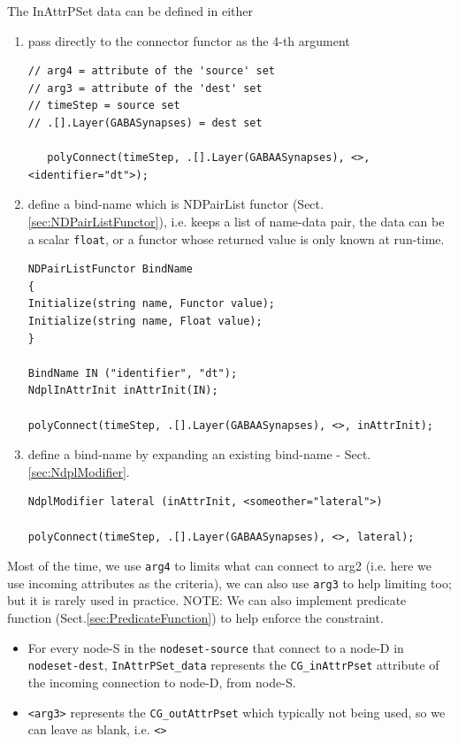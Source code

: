 The InAttrPSet data can be defined in either 
\begin{enumerate}
  \item pass directly to the connector functor as the 4-th argument

\begin{verbatim}
// arg4 = attribute of the 'source' set
// arg3 = attribute of the 'dest' set
// timeStep = source set
// .[].Layer(GABASynapses) = dest set

   polyConnect(timeStep, .[].Layer(GABAASynapses), <>, <identifier="dt">);
\end{verbatim}

  \item define a bind-name which is NDPairList functor
  (Sect.\ref{sec:NDPairListFunctor}), i.e. keeps a list of name-data pair, the
  data can be a scalar \verb!float!, or a functor whose returned value is only
  known at run-time.
  
\begin{verbatim}
NDPairListFunctor BindName
{
Initialize(string name, Functor value);
Initialize(string name, Float value);
}

BindName IN ("identifier", "dt");
NdplInAttrInit inAttrInit(IN);

polyConnect(timeStep, .[].Layer(GABAASynapses), <>, inAttrInit);

\end{verbatim}

   \item define a bind-name by expanding an existing bind-name -
   Sect.\ref{sec:NdplModifier}.
   
\begin{verbatim}
NdplModifier lateral (inAttrInit, <someother="lateral">)

polyConnect(timeStep, .[].Layer(GABAASynapses), <>, lateral);
\end{verbatim}
\end{enumerate}

Most of the time, we use \verb!arg4! to limits what can connect to arg2 (i.e.
here we use incoming attributes as the criteria), we can also use \verb!arg3! to
help limiting too; but it is rarely used in practice.
NOTE: We can also implement predicate function
(Sect.\ref{sec:PredicateFunction}) to help enforce the constraint.

\begin{itemize}
  \item For every node-S in the \verb!nodeset-source! that connect to a node-D
  in \verb!nodeset-dest!, \verb!InAttrPSet_data! represents the
  \verb!CG_inAttrPset! attribute of the incoming connection to node-D, from
  node-S.
  
  \item \verb!<arg3>! represents the \verb!CG_outAttrPset! which typically not
  being used, so we can leave as blank, i.e. \verb!<>!
\end{itemize}

